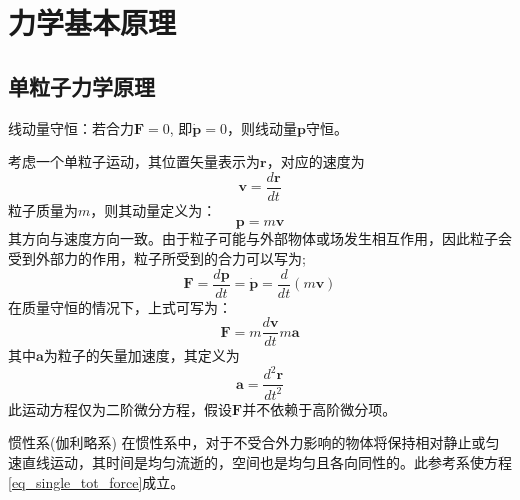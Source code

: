 \chapter{力学基本原理}

\section{单粒子力学原理}
\begin{theorem}[单粒子守恒原理]
	线动量守恒：若合力$\bm{F} = 0$, 即$\bm{\dot{p}} = 0$，则线动量$\bm{p}$守恒。
\end{theorem}
考虑一个单粒子运动，其位置矢量表示为$\bm{r}$，对应的速度为
\begin{equation}
  \bm{v} = \frac{d \bm{r}}{d t} \label{eq_single_velocity}
\end{equation}
粒子质量为$m$，则其动量定义为：
\begin{equation}
  \bm{p} = m \bm{v}   \label{eq_single_momentum}
\end{equation}
其方向与速度方向一致。由于粒子可能与外部物体或场发生相互作用，因此粒子会受到外部力的作用，粒子所受到的合力可以写为;
\begin{equation}
  \bm{F} = \frac{d \bm{p}}{dt} = \dot{\bm{p}} = \frac{d }{dt}(m\bm{v})  \label{eq_single_tot_force}
\end{equation}
在质量守恒的情况下，上式可写为：
\begin{equation}
  \bm{F} = m \frac{d\bm{v}}{dt} m \bm{a}
\end{equation}
其中$\bm{a}$为粒子的矢量加速度，其定义为
\begin{equation}
	\bm{a} = \frac{d^2 \bm{r}}{dt^2}
\end{equation}
此运动方程仅为二阶微分方程，假设$\bm{F}$并不依赖于高阶微分项。
\begin{definition}{惯性系(伽利略系)}
	在惯性系中，对于不受合外力影响的物体将保持相对静止或匀速直线运动，其时间是均匀流逝的，空间也是均匀且各向同性的。此参考系使方程\eqref{eq_single_tot_force}成立。
\end{definition}

